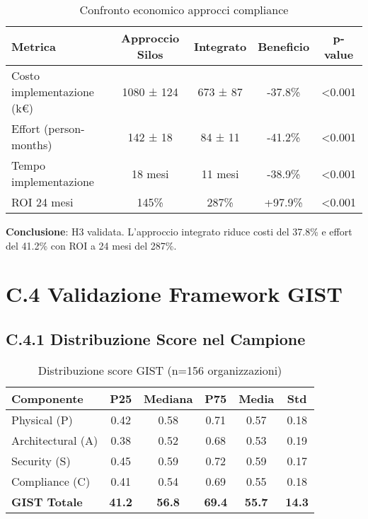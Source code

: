 \begin{table}[htbp]
\centering
\begin{tabular}{lcccc}
\toprule
\textbf{Metrica} & \textbf{Approccio Silos} & \textbf{Integrato} & \textbf{Beneficio} & \textbf{p-value} \\
\midrule
Costo implementazione (k€) & 1080 ± 124 & 673 ± 87 & -37.8\% & <0.001 \\
Effort (person-months) & 142 ± 18 & 84 ± 11 & -41.2\% & <0.001 \\
Tempo implementazione & 18 mesi & 11 mesi & -38.9\% & <0.001 \\
ROI 24 mesi & 145\% & 287\% & +97.9\% & <0.001 \\
\bottomrule
\end{tabular}
\caption{Confronto economico approcci compliance}
\end{table}

\textbf{Conclusione}: H3 validata. L'approccio integrato riduce costi del 37.8\% e effort del 41.2\% con ROI a 24 mesi del 287\%.

\section{C.4 Validazione Framework GIST}

\subsection{C.4.1 Distribuzione Score nel Campione}

\begin{table}[htbp]
\centering
\begin{tabular}{lccccc}
\toprule
\textbf{Componente} & \textbf{P25} & \textbf{Mediana} & \textbf{P75} & \textbf{Media} & \textbf{Std} \\
\midrule
Physical (P) & 0.42 & 0.58 & 0.71 & 0.57 & 0.18 \\
Architectural (A) & 0.38 & 0.52 & 0.68 & 0.53 & 0.19 \\
Security (S) & 0.45 & 0.59 & 0.72 & 0.59 & 0.17 \\
Compliance (C) & 0.41 & 0.54 & 0.69 & 0.55 & 0.18 \\
\textbf{GIST Totale} & \textbf{41.2} & \textbf{56.8} & \textbf{69.4} & \textbf{55.7} & \textbf{14.3} \\
\bottomrule
\end{tabular}
\caption{Distribuzione score GIST (n=156 organizzazioni)}
\end{table}

